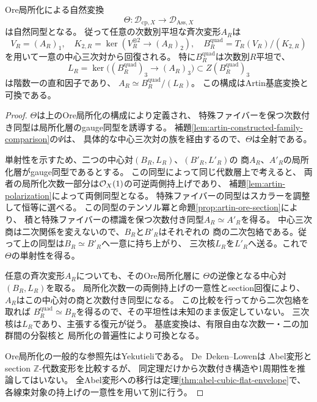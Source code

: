 \begin{theorem}[斉次環の全Artin変形の二次cover]
\label{thm:artin-quadratic-cover}
Ore局所化による自然変換
\[
 \Theta:\mathcal D_{\mathrm{cp},X}
       \longrightarrow\mathcal D_{\mathrm{Ass},X}
\]
は自然同型となる。
従って任意の次数別平坦な斉次変形$A_R$は
\[
 V_R=(A_R)_1,\quad
 K_{2,R}=\ker(V_R^{\otimes2}\to(A_R)_2),\quad
 B_R^{\mathrm{quad}}=T_R(V_R)/(K_{2,R})
\]
を用いて一意の中心三次対から回復される。
特に$B_R^{\mathrm{quad}}$は次数別$R$平坦で、
\[
 L_R=\ker\bigl((B_R^{\mathrm{quad}})_3\to(A_R)_3\bigr)
 \subset Z(B_R^{\mathrm{quad}})_3
\]
は階数一の直和因子であり、
$A_R\simeq B_R^{\mathrm{quad}}/(L_R)$。
この構成はArtin基底変換と可換である。
\end{theorem}
\begin{proof}
$\Theta$は上のOre局所化の構成により定義され、
特殊ファイバーを保つ次数付き同型は局所化層のgauge同型を誘導する。
補題\ref{lem:artin-constructed-family-comparison}の$\Psi$は、
具体的な中心三次対の族を経由するので、$\Theta$は全射である。

単射性を示すため、二つの中心対$(B_R,L_R)$、$(B'_R,L'_R)$の
商$A_R$、$A'_R$の局所化層がgauge同型であるとする。
この同型によって同じ代数層上で考えると、
両者の局所化次数一部分は$\mathcal O_X(1)$の可逆両側持上げであり、
補題\ref{lem:artin-polarization}によって両側同型となる。
特殊ファイバーの同型はスカラーを調整して恒等に選べる。
この同型のテンソル冪と命題\ref{prop:artin-ore-section}により、
積と特殊ファイバーの標識を保つ次数付き同型$A_R\simeq A'_R$を得る。
中心三次商は二次関係を変えないので、$B_R$と$B'_R$はそれぞれの
商の二次包絡である。従って上の同型は$B_R\simeq B'_R$へ一意に持ち上がり、
三次核$L_R$を$L'_R$へ送る。これで$\Theta$の単射性を得る。

任意の斉次変形$A_R$についても、そのOre局所化層に
$\Theta$の逆像となる中心対$(B_R,L_R)$を取る。
局所化次数一の両側持上げの一意性とsection回復により、
$A_R$はこの中心対の商と次数付き同型になる。
この比較を行ってから二次包絡を取れば
$B_R^{\mathrm{quad}}\simeq B_R$を得るので、その平坦性は未知のまま仮定していない。
三次核は$L_R$であり、主張する復元が従う。
基底変換は、有限自由な次数一・二の加群間の分裂核と
局所化の普遍性により可換となる。

Ore局所化の一般的な参照先はYekutieli\cite{YekutieliAffine}である。
De~Deken--Lowen\cite[Theorem~4.5]{DeDekenLowen}は
Abel変形とsection $\mathbb Z$-代数変形を比較するが、
同定理だけから次数付き構造や1周期性を推論してはいない。
全Abel変形への移行は定理\ref{thm:abel-cubic-flat-envelope}で、
各線束対象の持上げの一意性を用いて別に行う。
\end{proof}

